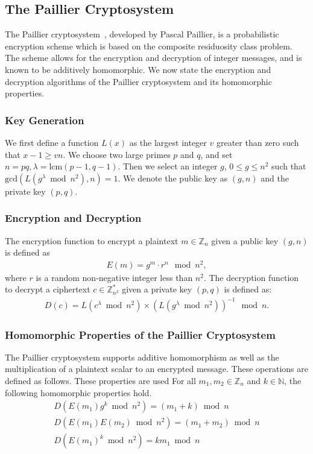 \subsection{The Paillier Cryptosystem}
The Paillier cryptosystem~\cite{stern_public-key_1999}, developed by Pascal Paillier, is a probabilistic encryption scheme which is based on the composite residuosity class problem. The scheme allows for the encryption and decryption of integer messages, and is known to be additively homomorphic. We now state the encryption and decryption algorithms of the Paillier cryptosystem and its homomorphic properties.

\subsubsection{Key Generation}
We first define a function $L(x)$ as the largest integer $v$ greater than zero such that $x-1 \geq vn$.
We choose two large primes $p$ and $q$, and set $n = pq, \lambda = \mathrm{lcm}(p-1,q-1)$.
Then we select an integer $g$, $0\leq g \leq n^2$ such that $\mathrm{gcd}(L(g^\lambda \bmod n^2), n) = 1$.
We denote the public key as $(g,n)$ and the private key $(p,q)$.
\subsubsection{Encryption and Decryption}
The encryption function to encrypt a plaintext $m \in \mathbb{Z}_n$ given a public key $(g,n)$ is defined as
\begin{align*}
	E(m) = g^m \cdot r^n \mod{n^2},
\end{align*}
where $r$ is a random non-negative integer less than $n^2$.
The decryption function to decrypt a ciphertext $c \in \mathbb{Z}^*_{n^2}$ given a private key $(p,q)$ is defined as:
\begin{align*}
	D(c) = L(c^\lambda \bmod n^2) \times (L(g^\lambda \bmod n^2))^{-1} \mod n.
\end{align*}
\subsubsection{Homomorphic Properties of the Paillier Cryptosystem}
The Paillier cryptosystem supports additive homomorphism as well as the multiplication of a plaintext scalar to an encrypted message. These operations are defined as follows. These properties are used
For all $m_1,m_2 \in \mathbb{Z}_n$ and $k\in \mathbb{N}$, the following homomorphic properties hold.
\begin{align*}
	D(E(m_1)g^k\bmod n^2)=(m_1+k)\bmod n\\
	D(E(m_1)E(m_2)\bmod n^2)=(m_1+m_2)\bmod n\\
	D(E(m_1)^k\bmod n^2)= km_1\bmod n
\end{align*}

